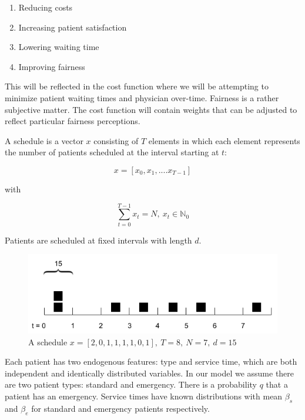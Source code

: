 \documentclass[
  10pt,
  letterpaper,
]{article}
\begin{document}
\begin{enumerate}
\def\labelenumi{\arabic{enumi}.}
\item
  Reducing costs
\item
  Increasing patient satisfaction
\item
  Lowering waiting time
\item
  Improving fairness
\end{enumerate}

This will be reflected in the cost function where we will be attempting
to minimize patient waiting times and physician over-time. Fairness is a
rather subjective matter. The cost function will contain weights that
can be adjusted to reflect particular fairness perceptions.

A schedule is a vector \(x\) consisting of \(T\) elements in which each
element represents the number of patients scheduled at the interval
starting at \(t\):

\[
x = [x_0, x_1, ....x_{T-1}]
\]

with

\[
\displaystyle\sum_{t=0} ^{T-1} x_t = N,\ x_t \in \mathbb{N}_0
\]

Patients are scheduled at fixed intervals with length \(d\).

\begin{figure}

{\centering \includegraphics{images/schedule.png}

}

\caption{A schedule
\(x = [2, 0, 1, 1, 1, 1, 0, 1],\ T = 8,\ N = 7,\ d = 15\)}

\end{figure}

Each patient has two endogenous features: type and service time, which
are both independent and identically distributed variables. In our model
we assume there are two patient types: standard and emergency. There is
a probability \(q\) that a patient has an emergency. Service times have
known distributions with mean \(\beta_s\) and \(\beta_e\) for standard
and emergency patients respectively.
\end{document}

